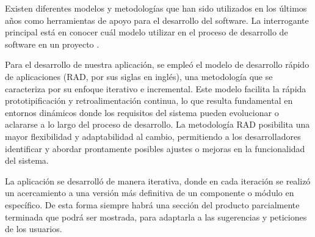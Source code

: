 Existen diferentes modelos y metodologías que han sido utilizados en los últimos años como herramientas de apoyo para el desarrollo del software. La interrogante principal está en conocer cuál modelo utilizar en el proceso de desarrollo de software en un proyecto \cite{DELGADOOLIVERA2021}.

Para el desarrollo de nuestra aplicación, se empleó el modelo de desarrollo rápido de aplicaciones (RAD, por sus siglas en inglés), una metodología que se caracteriza por su enfoque iterativo e incremental. Este modelo facilita la rápida prototipificación y retroalimentación continua, lo que resulta fundamental en entornos dinámicos donde los requisitos del sistema pueden evolucionar o aclararse a lo largo del proceso de desarrollo. La metodología RAD posibilita una mayor flexibilidad y adaptabilidad al cambio, permitiendo a los desarrolladores identificar y abordar prontamente posibles ajustes o mejoras en la funcionalidad del sistema. 

La aplicación se desarrolló de manera iterativa, donde en cada iteración se realizó un acercamiento a una versión más definitiva de un componente o módulo en específico. De esta forma siempre habrá una sección del producto parcialmente terminada que podrá ser mostrada, para adaptarla a las sugerencias y peticiones de los usuarios.